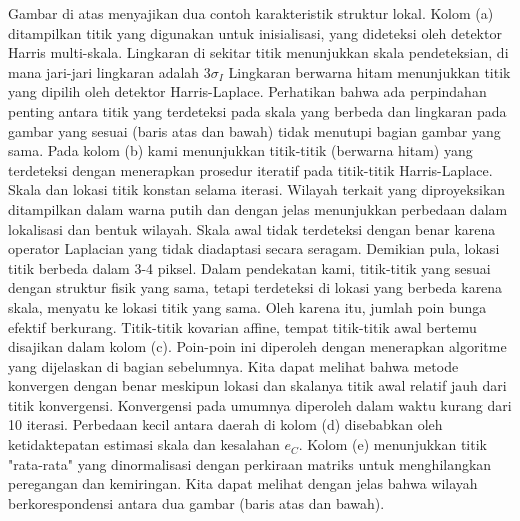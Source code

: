 Gambar di atas menyajikan dua contoh karakteristik struktur lokal. Kolom (a) ditampilkan 
titik yang digunakan untuk inisialisasi, yang dideteksi oleh detektor Harris multi-skala.
Lingkaran di sekitar titik menunjukkan skala pendeteksian, di mana jari-jari lingkaran adalah \(3\sigma_{I}\) Lingkaran berwarna hitam menunjukkan
titik yang dipilih oleh detektor Harris-Laplace. Perhatikan bahwa ada perpindahan penting antara titik yang terdeteksi pada skala yang berbeda dan lingkaran pada gambar yang sesuai (baris atas dan bawah) tidak menutupi bagian gambar yang sama. Pada kolom (b) kami menunjukkan titik-titik (berwarna hitam) yang terdeteksi dengan menerapkan prosedur iteratif pada titik-titik Harris-Laplace. Skala dan lokasi titik konstan selama iterasi. Wilayah terkait yang diproyeksikan ditampilkan dalam warna putih dan dengan jelas menunjukkan perbedaan dalam lokalisasi dan bentuk wilayah. Skala awal tidak terdeteksi dengan benar karena operator Laplacian yang tidak diadaptasi secara seragam. Demikian pula, lokasi titik berbeda dalam 3-4 piksel. Dalam pendekatan kami, titik-titik yang sesuai dengan struktur fisik yang sama, tetapi terdeteksi di lokasi yang berbeda karena skala, menyatu ke lokasi titik yang sama. Oleh karena itu, jumlah poin bunga efektif berkurang. Titik-titik kovarian affine, tempat titik-titik awal bertemu disajikan dalam kolom (c). Poin-poin ini diperoleh dengan menerapkan algoritme yang dijelaskan di bagian sebelumnya. Kita dapat melihat bahwa metode konvergen dengan benar meskipun lokasi dan skalanya
titik awal relatif jauh dari titik konvergensi. Konvergensi pada umumnya diperoleh dalam waktu kurang dari 10 iterasi. Perbedaan kecil antara daerah di kolom (d) disebabkan oleh ketidaktepatan estimasi skala dan kesalahan \(e_{C}\). Kolom (e) menunjukkan titik "rata-rata" yang dinormalisasi
dengan perkiraan matriks untuk menghilangkan peregangan dan kemiringan. Kita dapat melihat dengan jelas bahwa wilayah berkorespondensi antara dua gambar (baris atas dan bawah).